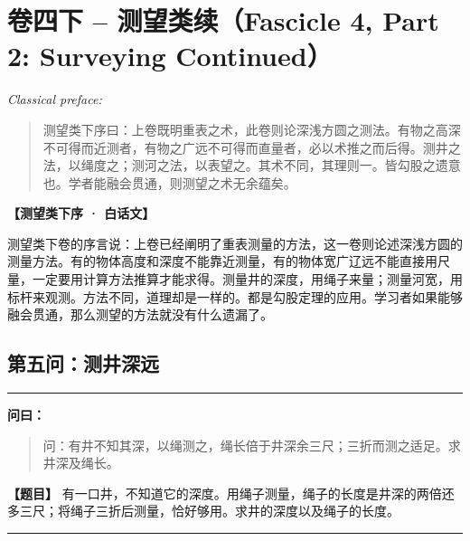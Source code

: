 \documentclass[11pt,a4paper]{article}
\newenvironment{mathproblem}[1][]{%
  \medskip\noindent\rule{\textwidth}{0.4pt}%
  \par\noindent{\Large\bfseries\color{sectioncolor}#1}\par\nopagebreak%
  \smallskip%
}{%
  \par\noindent\rule{\textwidth}{0.4pt}\medskip%
}
\newcommand{\wenlabel}{\textbf{\color{origcolor}问曰：}}
\newcommand{\modwenlabel}{\textbf{\color{modcolor}【题目】}}
\begin{document}
\newpage

\section{卷四下 -- 测望类续（Fascicle 4, Part 2: Surveying Continued）}
\label{sec:juan4xia}

\noindent\textit{Classical preface:}

\begin{originaltext}
\begin{quote}
\textcolor{origcolor}{%
测望类下序曰：上卷既明重表之术，此卷则论深浅方圆之测法。有物之高深不可得而近测者，有物之广远不可得而直量者，必以术推之而后得。测井之法，以绳度之；测河之法，以表望之。其术不同，其理则一。皆勾股之遗意也。学者能融会贯通，则测望之术无余蕴矣。
}
\end{quote}
\end{originaltext}

\begin{moderntext}
\textbf{【测望类下序 · 白话文】}

测望类下卷的序言说：上卷已经阐明了重表测量的方法，这一卷则论述深浅方圆的测量方法。有的物体高度和深度不能靠近测量，有的物体宽广辽远不能直接用尺量，一定要用计算方法推算才能求得。测量井的深度，用绳子来量；测量河宽，用标杆来观测。方法不同，道理却是一样的。都是勾股定理的应用。学习者如果能够融会贯通，那么测望的方法就没有什么遗漏了。
\end{moderntext}

\subsection*{第五问：测井深远}

\begin{mathproblem}[\textbf{第五问：测井深远}]

\begin{originaltext}
\wenlabel
\begin{quote}
\textcolor{origcolor}{%
问：有井不知其深，以绳测之，绳长倍于井深余三尺；三折而测之适足。求井深及绳长。
}
\end{quote}
\end{originaltext}

\begin{moderntext}
\modwenlabel
有一口井，不知道它的深度。用绳子测量，绳子的长度是井深的两倍还多三尺；将绳子三折后测量，恰好够用。求井的深度以及绳子的长度。
\end{moderntext}

\end{mathproblem}
\end{document}
